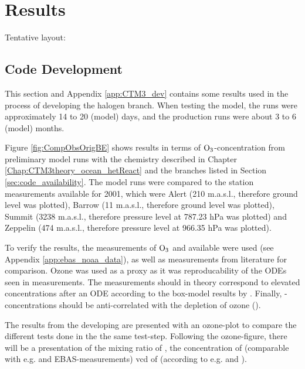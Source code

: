 \setcounter{chapter}{5}
\chapter{Results}\label{chap:results}

Tentative layout: 


\section{Code Development}\label{sec:results_code_development}

This section and Appendix \ref{app:CTM3_dev} contains some results used in the process of developing the halogen branch. When testing the model, the runs were approximately 14 to 20 (model) days, and the production runs were about 3 to 6 (model) months.

\medskip

Figure \ref{fig:CompObsOrigBE} shows results in terms of $\mathrm{O_3}$-concentration from preliminary model runs with the chemistry described in Chapter \ref{Chap:CTM3theory_ocean_hetReact} and the branches listed in Section \ref{sec:code_availability}. The model runs were compared to the station measurements available for 2001, which were Alert (210 m.a.s.l., therefore ground level was plotted), Barrow (11 m.a.s.l., therefore ground level was plotted), Summit (3238 m.a.s.l., therefore pressure level at 787.23 hPa was plotted) and Zeppelin (474 m.a.s.l., therefore pressure level at 966.35 hPa was plotted). 

\medskip

To verify the results, the measurements of $\mathrm{O_3}$ and  available were used (see Appendix \ref{app:ebas_noaa_data}), as well as  measurements from literature for comparison. Ozone was used as a proxy as it was reproducability of the ODEs seen in measurements. The  measurements should in theory correspond to elevated concentrations after an ODE according to the box-model results by \cite{CAO}. Finally, -concentrations should be anti-correlated with the depletion of ozone (\cite{barrie}). 

\medskip

The results from the developing are presented with an ozone-plot to compare the different tests done in the the same test-step. Following the ozone-figure, there will be a presentation of the mixing ratio of , the concentration of  (comparable with e.g. \cite{barrie} and EBAS-measurements) \acrlong{vcd} of  (according to e.g. \cite{Peterson2015} and \cite{Simpson2017}).

